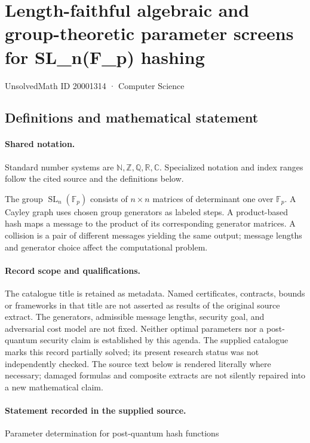 \documentclass[11pt]{article}
\begin{document}
\setcounter{section}{20001313}
\section{Length-faithful algebraic and group-theoretic parameter screens for SL\_n(F\_p) hashing}\label{20001314}
{\small\sffamily UnsolvedMath ID 20001314 · Computer Science}
\subsection{Definitions and mathematical statement}

\paragraph{Shared notation.}Standard number systems are $\mathbb N,\mathbb Z,\mathbb Q,\mathbb R,\mathbb C$. Specialized notation and index ranges follow the cited source and the definitions below.


The group $\operatorname{SL}_n(\mathbb F_p)$ consists of $n\times n$ matrices of determinant one over $\mathbb F_p$. A Cayley graph uses chosen group generators as labeled steps. A product-based hash maps a message to the product of its corresponding generator matrices. A collision is a pair of different messages yielding the same output; message lengths and generator choice affect the computational problem.
\paragraph{Record scope and qualifications.}
The catalogue title is retained as metadata. Named certificates, contracts, bounds or frameworks in that title are not asserted as results of the original source extract.
The generators, admissible message lengths, security goal, and adversarial cost model are not fixed. Neither optimal parameters nor a post-quantum security claim is established by this agenda. The supplied catalogue marks this record partially solved; its present research status was not independently checked.
The source text below is rendered literally where necessary; damaged formulas and composite extracts are not silently repaired into a new mathematical claim.
\paragraph{Statement recorded in the supplied source.}
Parameter determination for post-quantum hash functions
\end{document}
